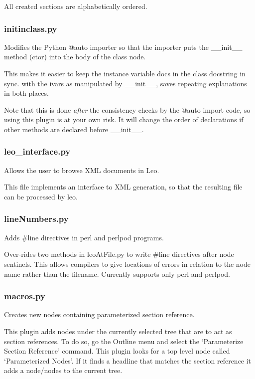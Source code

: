 \documentclass[a4paper,10pt,english]{sphinxmanual}
\begin{document}
All created sections are alphabetically ordered.


\subsubsection{initinclass.py}
\label{plugins:initinclass-py}
Modifies the Python @auto importer so that the importer
puts the \_\_init\_\_ method (ctor) into the body of the class node.

This makes it easier to keep the instance variable docs in the class
docstring in sync. with the ivars as manipulated by \_\_init\_\_, saves
repeating explanations in both places.

Note that this is done \emph{after} the consistency checks by the @auto
import code, so using this plugin is at your own risk.  It will change
the order of declarations if other methods are declared before \_\_init\_\_.


\subsubsection{leo\_interface.py}
\label{plugins:leo-interface-py}
Allows the user to browse XML documents in Leo.

This file implements an interface to XML generation,
so that the resulting file can be processed by leo.


\subsubsection{lineNumbers.py}
\label{plugins:linenumbers-py}
Adds \#line directives in perl and perlpod programs.

Over-rides two methods in leoAtFile.py to write \#line directives after node
sentinels. This allows compilers to give locations of errors in relation to the
node name rather than the filename. Currently supports only perl and perlpod.


\subsubsection{macros.py}
\label{plugins:macros-py}
Creates new nodes containing parameterized section reference.

This plugin adds nodes under the currently selected tree that are to act as
section references. To do so, go the Outline menu and select the
`Parameterize Section Reference' command. This plugin looks for a top level node called
`Parameterized Nodes'. If it finds a headline that matches the section reference
it adds a node/nodes to the current tree.
\end{document}
